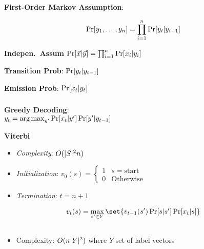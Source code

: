 \documentclass[9pt]{extarticle}
\renewcommand{\green}[1]{{\color{ForestGreen} #1}}
\newcommand{\greenbf}[1]{\textbf{\green{#1}}}
\begin{document}
\begin{multicols}{3}
  \greenbf{First-Order Markov Assumption}:

  \begin{equation*}
    \Pr\lbrack y_{1},\ldots,y_{n}\rbrack = \prod_{i=1}^{n} \Pr[y_{i} \vert y_{i-1}]
  \end{equation*}

  \greenbf{Indepen.\ Assum} $\Pr\lbrack\vec{x} \vert \vec{y}\rbrack = \prod_{i=1}^{n} \Pr[x_{i} \vert y_{i}]$

  \greenbf{Transition Prob}: $\Pr\lbrack y_{t} \vert y_{t-1}\rbrack$

  \greenbf{Emission Prob}: $\Pr\lbrack x_{t} \vert y_{t}\rbrack$

  \subsubsection*{}

  \greenbf{Greedy Decoding}: \\${y_t = \operatorname*{arg\,max}_{y'} \Pr[x_t \vert y'] \Pr[y' \vert y_{t-1}]}$

  \greenbf{Viterbi}
  \begin{itemize}
    \item \textit{Complexity}: $O(\lvert S\rvert^{2} n)$
    \item \textit{Initialization}: $v_0(s) = \begin{cases}
                                               1 & s = \text{start} \\
                                               0 & \text{Otherwise}
                                             \end{cases}$
    \item \textit{Termination}: $t = n+1$
  \end{itemize}

  \begin{equation*}
    v_{t}(s) = \max_{s' \in Y}\set{v_{t-1}(s') \Pr[s \vert s'] \Pr[x_t \vert s]}
  \end{equation*}

  \subsection*{}
  \subsection*{}
  \begin{itemize}
    \item Complexity: $O(n\lvert Y\rvert^{2})$ where $Y$ set of label vectors
  \end{itemize}


\end{multicols}
\end{document}
